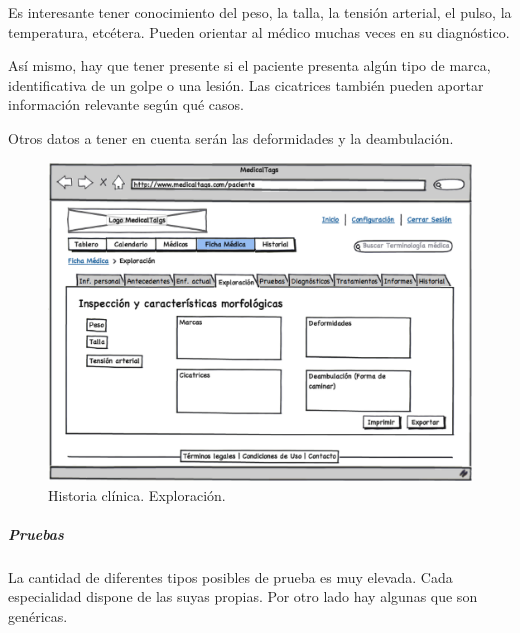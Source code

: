 \documentclass[a4paper,oneside,11pt]{book}
\begin{document}
			Es interesante tener conocimiento del peso, la talla, la tensión arterial, el pulso, la temperatura, etcétera. Pueden orientar al médico muchas veces en su diagnóstico.
			
			Así mismo, hay que tener presente si el paciente presenta algún tipo de marca, identificativa de un golpe o una lesión. Las cicatrices también pueden aportar información relevante según qué casos.
			
			Otros datos a tener en cuenta serán las deformidades y la deambulación.
			
			
			
			\begin{figure}[H]
			  \centering
			    \includegraphics[width=12cm]{img/eps/33_Exploracion_paciente.eps}
			  \caption{Historia clínica. Exploración.}
			  \label{fig:exploracion}
			\end{figure}
			
		
		\bigskip
		\bigskip
		\bigskip
		\subparagraph{Pruebas} %
		\label{par:pruebas}
			
			La cantidad de diferentes tipos posibles de prueba es muy elevada. Cada especialidad dispone de las suyas propias. Por otro lado hay algunas que son genéricas.
			
\end{document}
